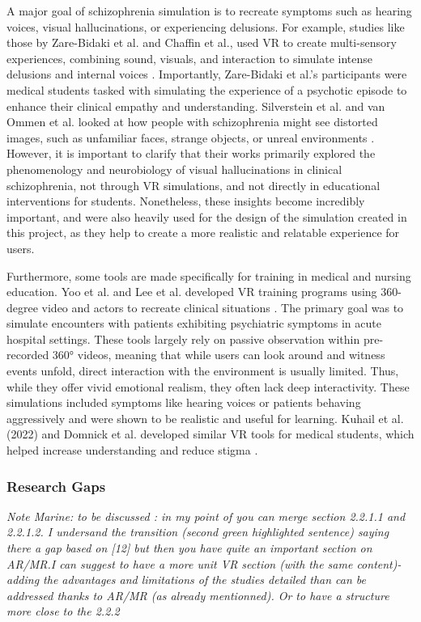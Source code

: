A major goal of schizophrenia simulation is to recreate symptoms such as hearing voices, visual hallucinations, or experiencing delusions. For example, studies like those by Zare-Bidaki et al. and Chaffin et al., used VR to create multi-sensory experiences, combining sound, visuals, and interaction to simulate intense delusions and internal voices \cite{Zare-Bidaki2022,Chaffin2013}. Importantly, Zare-Bidaki et al.'s participants were medical students tasked with simulating the experience of a psychotic episode to enhance their clinical empathy and understanding. Silverstein et al. and van Ommen et al. looked at how people with schizophrenia might see distorted images, such as unfamiliar faces, strange objects, or unreal environments \cite{Silverstein2021,Vanommen2019}. However, it is important to clarify that their works primarily explored the phenomenology and neurobiology of visual hallucinations in clinical schizophrenia, not through VR simulations, and not directly in educational interventions for students. Nonetheless, these insights become incredibly important, and were also heavily used for the design of the simulation created in this project, as they help to create a more realistic and relatable experience for users.

Furthermore, some tools are made specifically for training in medical and nursing education. Yoo et al. and Lee et al. developed VR training programs using 360-degree video and actors to recreate clinical situations \cite{Yoo2020, Lee2020}. The primary goal was to simulate encounters with patients exhibiting psychiatric symptoms in acute hospital settings. These tools largely rely on passive observation within pre-recorded 360° videos, meaning that while users can look around and witness events unfold, direct interaction with the environment is usually limited. Thus, while they offer vivid emotional realism, they often lack deep interactivity. These simulations included symptoms like hearing voices or patients behaving aggressively and were shown to be realistic and useful for learning. Kuhail et al. (2022) and Domnick et al. developed similar VR tools for medical students, which helped increase understanding and reduce stigma \cite{Kuhail2022, Domnick2023}.

\subsubsection{Research Gaps}

\emph{Note Marine: to be discussed : in my point of you can merge section 2.2.1.1 and 2.2.1.2. I undersand the transition (second green highlighted sentence) saying there a gap based on [12] but then you have quite an important section on AR/MR.I can suggest to have a more unit VR section (with the same content)- adding the advantages and limitations of the studies detailed than can be addressed thanks to AR/MR (as already mentionned). Or to have a structure more close to the 2.2.2}

